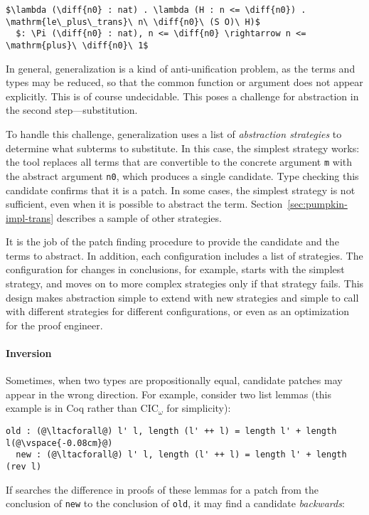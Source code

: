 \begin{lstlisting}[language=coq]
  $\lambda (\diff{n0} : nat) . \lambda (H : n <= \diff{n0}) . \mathrm{le\_plus\_trans}\ n\ \diff{n0}\ (S O)\ H)$
  $: \Pi (\diff{n0} : nat), n <= \diff{n0} \rightarrow n <= \mathrm{plus}\ \diff{n0}\ 1$
\end{lstlisting}

In general, generalization is a kind of anti-unification problem, %
as the terms and types may be reduced,
so that the common function or argument does not appear explicitly.
This is of course undecidable.
This poses a challenge for abstraction in the second step---substitution.

To handle this challenge, generalization uses a list of \textit{abstraction strategies} to determine what subterms to substitute.
In this case, the simplest strategy works: the tool
replaces all terms that are convertible to the concrete argument \lstinline{m} with the abstract argument
\lstinline{n0}, which produces a single candidate. Type checking this candidate confirms that it is a patch.
In some cases, the simplest strategy is not sufficient, even when it is possible to abstract the term.
Section~\ref{sec:pumpkin-impl-trans} describes a sample of other strategies.

It is the job of the patch finding procedure to provide the candidate and the terms to abstract.
In addition, each configuration includes a list of strategies.
The configuration for changes in conclusions, for example, starts with the simplest strategy,
and moves on to more complex strategies only if that strategy fails.
This design makes abstraction simple to extend with new strategies and simple to call with different strategies
for different configurations, or even as an optimization for the proof engineer.

\paragraph{Inversion} Sometimes, when two types are propositionally equal, %
candidate patches may appear in the wrong direction.
For example, consider two list lemmas (this example is in Coq rather than CIC$_{\omega}$ for simplicity): %

\begin{lstlisting}[language=coq]
  old : (@\ltacforall@) l' l, length (l' ++ l) = length l' + length l(@\vspace{-0.08cm}@)
  new : (@\ltacforall@) l' l, length (l' ++ l) = length l' + length (rev l)
\end{lstlisting} 
If \sysname searches the difference in proofs of these lemmas for a patch from the 
conclusion of \lstinline{new} to the conclusion of \lstinline{old},
it may find a candidate \emph{backwards}:

